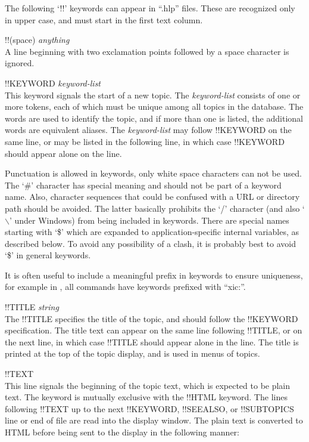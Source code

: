 The following `{\vt !!}' keywords can appear in ``{\vt .hlp}'' files.
These are recognized only in upper case, and must start in the first
text column.

\begin{description}
\item{{\vt !!}(space) {\it anything}}\\
A line beginning with two exclamation points followed by a space
character is ignored.

\item{\vt !!KEYWORD {\it keyword-list}}\\
This keyword signals the start of a new topic.  The {\it keyword-list}
consists of one or more tokens, each of which must be unique among all
topics in the database.  The words are used to identify the topic, and
if more than one is listed, the additional words are equivalent
aliases.  The {\it keyword-list} may follow {\vt !!KEYWORD} on the
same line, or may be listed in the following line, in which case {\vt
!!KEYWORD} should appear alone on the line.

Punctuation is allowed in keywords, only white space characters can
not be used.  The `{\vt \#}' character has special meaning and should
not be part of a keyword name.  Also, character sequences that could
be confused with a URL or directory path should be avoided.  The
latter basically prohibits the `{\vt /}' character (and also
`$\backslash$' under Windows) from being included in keywords.  There
are special names starting with `\$' which are expanded to
application-specific internal variables, as described below.  To avoid
any possibility of a clash, it is probably best to avoid `\$' in
general keywords.

It is often useful to include a meaningful prefix in keywords to
ensure uniqueness, for example in {\Xic}, all commands have keywords
prefixed with ``{\vt xic:}''.

\item{\vt !!TITLE {\it string}}\\
The {\vt !!TITLE} specifies the title of the topic, and should follow
the {\vt !!KEYWORD} specification.  The title text can appear on the
same line following {\vt !!TITLE}, or on the next line, in which case
{\vt !!TITLE} should appear alone in the line.  The title is printed
at the top of the topic display, and is used in menus of topics.

\item{\vt !!TEXT}\\
This line signals the beginning of the topic text, which is expected
to be plain text.  The keyword is mutually exclusive with the {\vt
!!HTML} keyword.  The lines following {\vt !!TEXT} up to the next {\vt
!!KEYWORD}, {\vt !!SEEALSO}, or {\vt !!SUBTOPICS} line or end of file
are read into the display window.  The plain text is converted to HTML
before being sent to the display in the following manner:


\end{description}
